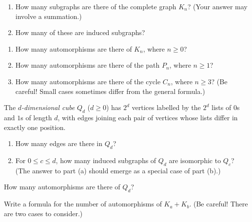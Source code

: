 \documentclass[12pt,letterpaper]{hmcpset}
\begin{document}

\begin{problem}[1]
    \begin{enumerate}
        \item How many subgraphs are there of the complete graph $K_n$? (Your answer may involve a summation.)
        \item How many of these are induced subgraphs?
    \end{enumerate}
\end{problem}
\begin{solution}
    \vfill
\end{solution}
\newpage

\begin{problem}[2]
    \begin{enumerate}
        \item How many automorphisms are there of $K_n$, where $n\ge 0$?
        \item How many automorphisms are there of the path $P_n$, where $n\ge 1$?
        \item How many automorphisms are there of the cycle $C_n$, where $n\ge 3$? (Be careful! Small cases sometimes differ from the general formula.)
    \end{enumerate}
\end{problem}
\begin{solution}
    \vfill
\end{solution}
\newpage

\begin{problem}[3]
    The {\it $d$-dimensional cube\/} $Q_d$ ($d\ge 0$) has $2^d$ vertices labelled by the $2^d$ lists of $0$s and $1$s of length $d$, with edges joining each pair of vertices whose lists differ in exactly one position.
    \begin{enumerate}
        \item How many edges are there in $Q_d$?
        \item For $0\le c\le d$, how many induced subgraphs of $Q_d$ are isomorphic to $Q_c$? (The answer to part (a) should emerge as a special case of part (b).)
    \end{enumerate}
\end{problem}
\begin{solution}
    \vfill
\end{solution}
\newpage

\begin{problem}[4]
    How many automorphisms are there of $Q_d$?
\end{problem}
\begin{solution}
    \vfill
\end{solution}
\newpage

\begin{problem}[5]
    Write a formula for the number of automorphisms of $K_a+K_b$. (Be careful! There are two cases to consider.)
\end{problem}
\begin{solution}
    \vfill
\end{solution}
\end{document}
